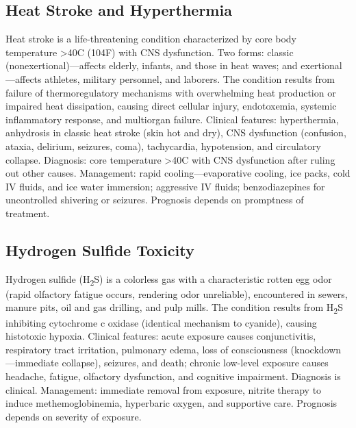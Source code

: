 \subsection{Heat Stroke and Hyperthermia}
\label{sec:Heat Stroke}
Heat stroke is a life-threatening condition characterized by core body temperature >40\textdegree C (104\textdegree F) with CNS dysfunction. Two forms: classic (nonexertional)---affects elderly, infants, and those in heat waves; and exertional---affects athletes, military personnel, and laborers. The condition results from failure of thermoregulatory mechanisms with overwhelming heat production or impaired heat dissipation, causing direct cellular injury, endotoxemia, systemic inflammatory response, and multiorgan failure. Clinical features: hyperthermia, anhydrosis in classic heat stroke (skin hot and dry), CNS dysfunction (confusion, ataxia, delirium, seizures, coma), tachycardia, hypotension, and circulatory collapse. Diagnosis: core temperature >40\textdegree C with CNS dysfunction after ruling out other causes. Management: rapid cooling---evaporative cooling, ice packs, cold IV fluids, and ice water immersion; aggressive IV fluids; benzodiazepines for uncontrolled shivering or seizures. Prognosis depends on promptness of treatment.

\subsection{Hydrogen Sulfide Toxicity}
\label{sec:Hydrogen Sulfide Toxicity}
Hydrogen sulfide (H\textsubscript{2}S) is a colorless gas with a characteristic rotten egg odor (rapid olfactory fatigue occurs, rendering odor unreliable), encountered in sewers, manure pits, oil and gas drilling, and pulp mills. The condition results from H\textsubscript{2}S inhibiting cytochrome c oxidase (identical mechanism to cyanide), causing histotoxic hypoxia. Clinical features: acute exposure causes conjunctivitis, respiratory tract irritation, pulmonary edema, loss of consciousness (knockdown---immediate collapse), seizures, and death; chronic low-level exposure causes headache, fatigue, olfactory dysfunction, and cognitive impairment. Diagnosis is clinical. Management: immediate removal from exposure, nitrite therapy to induce methemoglobinemia, hyperbaric oxygen, and supportive care. Prognosis depends on severity of exposure.

